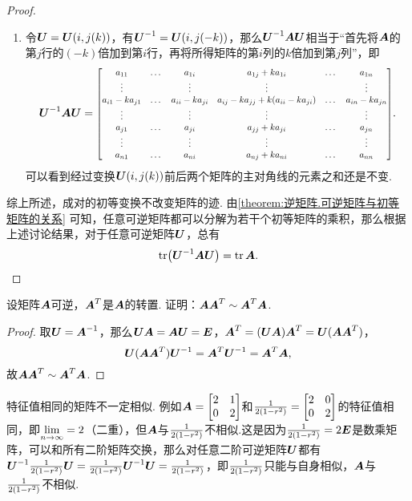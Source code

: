 \begin{property}
\begin{proof}
\begin{enumerate}
\item 令\(\P = \P(i,j(k))\)，有\(\P^{-1} = \P(i,j(-k))\)，那么\(\P^{-1} \A \P\)相当于“首先将\(\boldsymbol{A}\)的第\(j\)行的\((-k)\)倍加到第\(i\)行，再将所得矩阵的第\(i\)列的\(k\)倍加到第\(j\)列”，即\[
\P^{-1} \A \P
= \scalebox{.8}{\(\begin{bmatrix}
a_{11} & \dots & a_{1i} & a_{1j} + k a_{1i}  & \dots & a_{1n} \\
\vdots & & \vdots & \vdots & & \vdots \\
a_{i1} - k a_{j1} & \dots & a_{ii} - k a_{ji} & a_{ij} - k a_{jj} + k(a_{ii} - k a_{ji})  & \dots & a_{in} - k a_{jn} \\
\vdots & & \vdots & \vdots  & & \vdots \\
a_{j1} & \dots & a_{ji} & a_{jj} + k a_{ji}  & \dots & a_{jn} \\
\vdots & & \vdots & \vdots  & & \vdots \\
a_{n1} & \dots & a_{ni} & a_{nj} + k a_{ni}  & \dots & a_{nn}
\end{bmatrix}\)}.
\]可以看到经过变换\(\P(i,j(k))\)前后两个矩阵的主对角线的元素之和还是不变.
\end{enumerate}
综上所述，成对的初等变换不改变矩阵的迹.
由\cref{theorem:逆矩阵.可逆矩阵与初等矩阵的关系} 可知，任意可逆矩阵都可以分解为若干个初等矩阵的乘积，那么根据上述讨论结果，对于任意可逆矩阵\(\P\)，总有\[
\tr(\P^{-1}\A\P) = \tr\A.
\qedhere
\]
\end{proof}
\end{property}

\begin{example}
设矩阵\(\boldsymbol{A}\)可逆，\(\boldsymbol{A}^T\)是\(\boldsymbol{A}\)的转置.
证明：\(\boldsymbol{A}\boldsymbol{A}^T \sim \boldsymbol{A}^T\boldsymbol{A}\).
\begin{proof}
取\(\P=\A^{-1}\)，那么\(\P\A=\A\P=\E\)，\(\A^T = (\P\A)\A^T = \P(\A\A^T)\)，\[
\P(\A\A^T)\P^{-1} = \A^T\P^{-1} = \A^T\A,
\]故\(\boldsymbol{A}\boldsymbol{A}^T \sim \boldsymbol{A}^T\boldsymbol{A}\).
\end{proof}
\end{example}

\begin{example}
特征值相同的矩阵不一定相似.
例如\(\boldsymbol{A}=\begin{bmatrix} 2 & 1 \\ 0 & 2 \end{bmatrix}\)和\(\frac{1}{2(1-r^2)}=\begin{bmatrix} 2 & 0 \\ 0 & 2 \end{bmatrix}\)的特征值相同，即\(\lim\limits_{n\to\infty}=2\)（二重），但\(\boldsymbol{A}\)与\(\frac{1}{2(1-r^2)}\)不相似.这是因为\(\frac{1}{2(1-r^2)}=2\boldsymbol{E}\)是数乘矩阵，可以和所有二阶矩阵交换，那么对任意二阶可逆矩阵\(\P\)都有\(\P^{-1}\B\P=\B\P^{-1}\P=\B\)，即\(\frac{1}{2(1-r^2)}\)只能与自身相似，\(\boldsymbol{A}\)与\(\frac{1}{2(1-r^2)}\)不相似.
\end{example}

